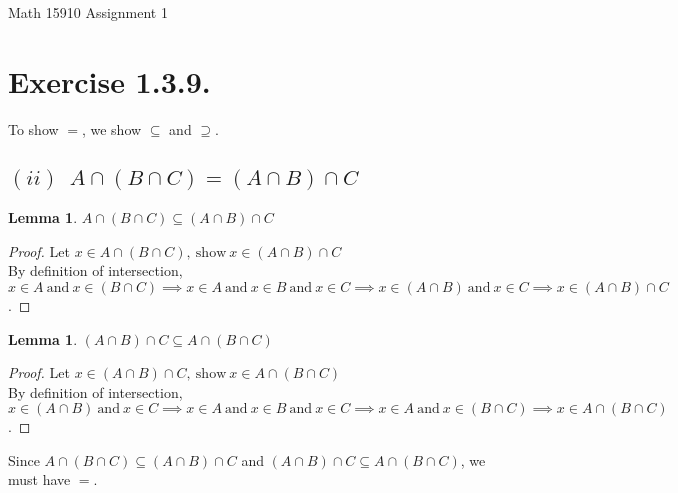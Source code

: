 \documentclass[12pt]{article}
\newtheorem{lemma}[theorem]{Lemma}
\theoremstyle{definition}
\numberwithin{equation}{subsection}
\begin{document}
\pagestyle{plain}



\begin{center}
{\large Math 15910 Assignment 1} \\ 
\vspace{.2in}  
\end{center}


\section{Exercise 1.3.9.}
To show $=$, we show $\subseteq$ and $\supseteq.$
\subsection*{$(ii) \enspace A \cap (B \cap C) = (A \cap B) \cap C $}
\begin{lemma}
$A \cap (B \cap C) \subseteq (A \cap B) \cap C $
\end{lemma}
\begin{proof}
Let $x \in A \cap (B \cap C), \ \text{show} \ x \in (A \cap B) \cap C$ \\
By definition of intersection, $ x \in A \ \text{and}\ x \in (B \cap C)
\implies x \in A \ \text{and}\ x \in B \ \text{and}\  x \in C 
\implies x \in (A \cap B) \ \text{and}\ x \in C 
\implies x \in (A \cap B) \cap C $.
\end{proof}

\begin{lemma}
$(A \cap B) \cap C \subseteq A \cap (B \cap C) $
\end{lemma}
\begin{proof}
Let $x \in (A \cap B) \cap C, \ \text{show} \ x \in A \cap (B \cap C)$ \\
By definition of intersection, $x \in (A \cap B) \ \text{and}\  x \in C
\implies x \in A \ \text{and}\ x \in B \ \text{and}\  x \in C 
\implies x \in A \ \text{and}\ x \in (B \cap C)
\implies x \in A \cap (B \cap C) $.
\end{proof}

Since $A \cap (B \cap C) \subseteq (A \cap B) \cap C $ and $(A \cap B) \cap C \subseteq A \cap (B \cap C) $, we must have $=$. 
\end{document}
